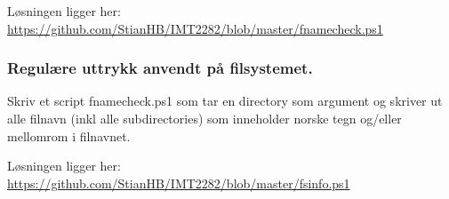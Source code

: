 \documentclass[9pt]{article}
\begin{document}
Løsningen ligger her:\\
\url{https://github.com/StianHB/IMT2282/blob/master/fnamecheck.ps1}

\subsubsection{Regulære uttrykk anvendt på filsystemet.}
Skriv et script fnamecheck.ps1 som tar en directory som argument og skriver ut alle filnavn (inkl alle subdirectories) som inneholder norske tegn og/eller mellomrom i filnavnet.

Løsningen ligger her:\\
\url{https://github.com/StianHB/IMT2282/blob/master/fsinfo.ps1}
\end{document}
